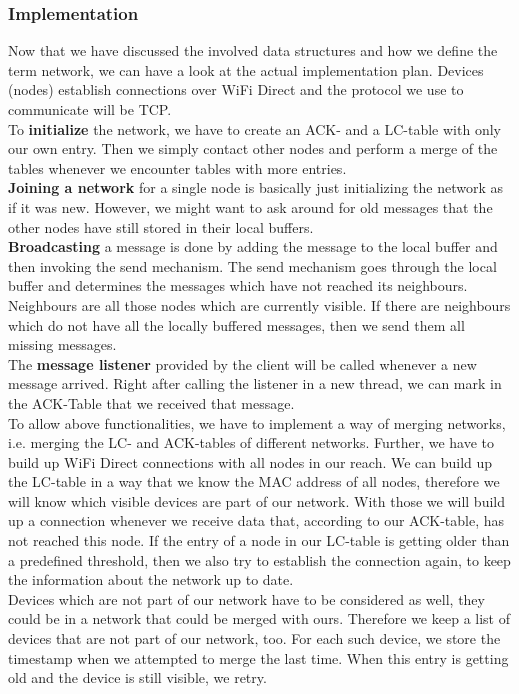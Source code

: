 	\subsubsection{Implementation}
Now that we have discussed the involved data structures and how we define the term network, we can have a look at the actual implementation plan. Devices (nodes) establish connections over WiFi Direct and the protocol we use to communicate will be TCP.\\
To \textbf{initialize} the network, we have to create an ACK- and a LC-table with only our own entry. Then we simply contact other nodes and perform a merge of the tables whenever we encounter tables with more entries. \\
\textbf{Joining a network} for a single node is basically just initializing the network as if it was new. However, we might want to ask around for old messages that the other nodes have still stored in their local buffers. \\ 
\textbf{Broadcasting} a message is done by adding the message to the local buffer and then invoking the send mechanism. The send mechanism goes through the local buffer and determines the messages which have not reached its neighbours. Neighbours are all those nodes which are currently visible. If there are neighbours which do not have all the locally buffered messages, then we send them all missing messages.\\
The \textbf{message listener} provided by the client will be called whenever a new message arrived. Right after calling the listener in a new thread, we can mark in the ACK-Table that we received that message.  \\
To allow above functionalities, we have to implement a way of merging networks, i.e. merging the LC- and ACK-tables of different networks. Further, we have to build up WiFi Direct connections with all nodes in our reach. We can build up the LC-table in a way that we know the MAC address of all nodes, therefore we will know which visible devices are part of our network. With those we will build up a connection whenever we receive data that, according to our ACK-table, has not reached this node. If the entry of a node in our LC-table is getting older than a predefined threshold, then we also try to establish the connection again, to keep the information about the network up to date. \\
Devices which are not part of our network have to be considered as well, they could be in a network that could be merged with ours. Therefore we keep a list of devices that are not part of our network, too. For each such device, we store the timestamp when we attempted to merge the last time. When this entry is getting old and the device is still visible, we retry. \\

